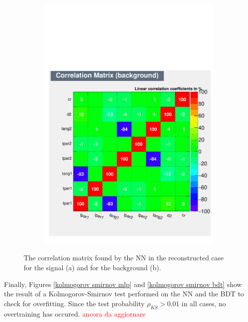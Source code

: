 \documentclass[10pt,a4paper]{book}
\newcommand\todo[1]{\textcolor{red}{#1}}
\begin{document}
\begin{figure}[h]
\begin{subfigure}{1.0\textwidth}
\includegraphics[scale=0.55]{reco/CorrelationMatrixB.pdf}
\caption{}
\end{subfigure}
\caption{The correlation matrix found by the NN in the reconstructed case for the signal (a) and for the background (b).}
\label{correlation reco}
\end{figure} 

Finally, Figures \ref{kolmogorov smirnov mlp} and \ref{kolmogorov smirnov bdt} show the result of a Kolmogorov-Smirnov test \cite{10.2307/2280095} performed on the NN and the BDT to check for overfitting. Since the test probability $\rho_{KS} > 0.01$ in all cases, no overtraining has occured. \todo{ancora da aggiornare}
\end{document}
